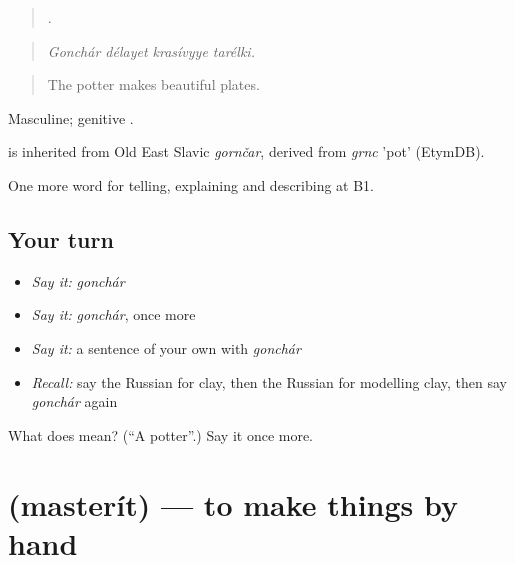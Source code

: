 \begin{quote}
   .
\end{quote}

\begin{quote}
\emph{Gonchár délayet krasívyye tarélki.}
\end{quote}

\begin{quote}
The potter makes beautiful plates.
\end{quote}

Masculine; genitive .

\begin{cousinweb}
\emph{} is inherited from Old East Slavic \emph{gornčar}, derived from \emph{grnc} 'pot' (EtymDB).
\end{cousinweb}

\begin{grammarlens}[title={What you've built}]
One more word for telling, explaining and describing at B1.
\end{grammarlens}

\subsection*{Your turn}
\begin{itemize}
\raggedright
  \item \emph{Say it:} \emph{gonchár}
  \item \emph{Say it:} \emph{gonchár}, once more
  \item \emph{Say it:} a sentence of your own with \emph{gonchár}
  \item \emph{Recall:} say the Russian for clay, then the Russian for modelling clay, then say \emph{gonchár} again
\end{itemize}

\begin{tcolorbox}[breakable,colback=teal!4,colframe=teal!35!black,title={Before you move on}]
What does  mean? (\textquotedblleft{}A potter\textquotedblright{}.) Say it once more.
\end{tcolorbox}
\section[\texorpdfstring{\ru{мастерить} (masterít)}{мастерить (masterít)}]{ (masterít) — to make things by hand}

\label{lesson:RU-C502-masterit}



